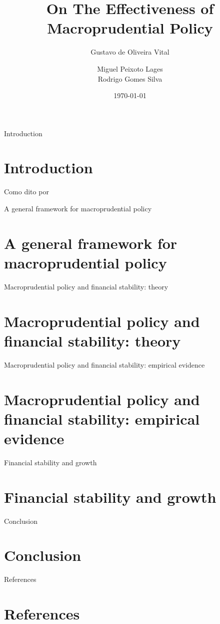 \documentclass{beamer}
\author{Gustavo de Oliveira Vital \and Miguel Peixoto Lages \\ Rodrigo Gomes Silva}
\date{\today}
\title{On The Effectiveness of Macroprudential Policy}
\institute{FEP - Faculdade de Economia do Porto}
\begin{document}

\begin{frame}
\maketitle
\end{frame}



\begin{frame}
    \tableofcontents
\end{frame}


\begin{frame}{Introduction}
    \section{Introduction}
    Como dito por \cite{ampudia2021effectiveness}
\end{frame}

\begin{frame}{A general framework for macroprudential policy}
    \section{A general framework for macroprudential policy}
\end{frame}

\begin{frame}{Macroprudential policy and financial stability: theory}
    \section{Macroprudential policy and financial stability: theory}
\end{frame}

\begin{frame}{Macroprudential policy and financial stability: empirical evidence}
    \section{Macroprudential policy and financial stability: empirical evidence}
\end{frame}

\begin{frame}{Financial stability and growth}
    \section{Financial stability and growth}
\end{frame}

\begin{frame}{Conclusion}
    \section{Conclusion}
\end{frame}


\begin{frame}[allowframebreaks]{References}
    \section{References}
    \nocite{ampudia2021effectiveness}
    
    
\end{frame}
\end{document}
